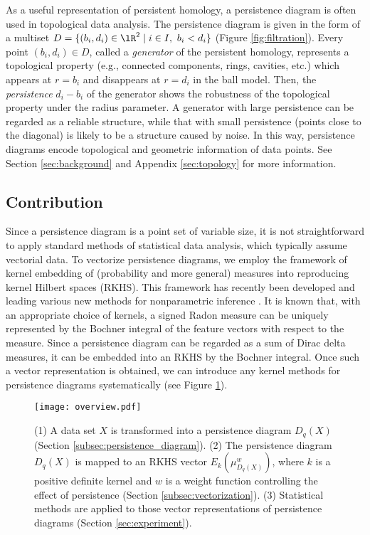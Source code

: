 \documentclass{article}
\begin{document}
As a useful representation of persistent homology, a persistence diagram is often used in topological data analysis.
The persistence diagram is given in the form of a multiset $D=\{(b_i,d_i) \in \lR^{2} \mid i\in I, \ b_i < d_i\}$ (Figure \ref{fig:filtration}).
Every point $(b_i,d_i)\in D$, called a {\em generator} of the persistent homology, represents a topological property (e.g., connected components, rings, cavities, etc.) which appears at $r=b_i$ and disappears at $r=d_i$ in the ball model.
Then, the {\em persistence} $d_i-b_i$ of the generator shows the robustness of the topological property under the radius parameter.
A generator with large persistence can be regarded as a reliable structure, while that with small persistence (points close to the diagonal) is likely to be a structure caused by noise.
In this way, persistence diagrams encode topological and geometric information of data points.
See Section \ref{sec:background} and Appendix \ref{sec:topology} for more information.

\subsection{Contribution}
\label{subsec:contribution}

Since a persistence diagram is a point set of variable size, it is not straightforward to apply standard methods of statistical data analysis, which typically assume vectorial data.
To vectorize persistence diagrams, we employ the framework of kernel embedding of (probability and more general) measures into reproducing kernel Hilbert spaces (RKHS).
This framework has recently been developed and leading various new methods for nonparametric inference \cite{MFSS17,SGSS07,SFG13}.
It is known \cite{SFL11} that, with an appropriate choice of kernels, a signed Radon measure can be uniquely represented by the Bochner integral of the feature vectors with respect to the measure.
Since a persistence diagram can be regarded as a sum of Dirac delta measures, it can be embedded into an RKHS by the Bochner integral.
Once such a vector representation is obtained, we can introduce any kernel methods for persistence diagrams systematically (see Figure \ref{fig:overview}). 
\begin{figure}[htbp]
\begin{center}
\texttt{[image: overview.pdf]}
\caption{
(1) A data set $X$ is transformed into a persistence diagram $D_q(X)$ (Section \ref{subsec:persistence_diagram}).
(2) The persistence diagram $D_q(X)$ is mapped to an RKHS vector $E_{k}(\mu_{D_{q}(X)}^{w})$, where $k$ is a positive definite kernel and $w$ is a weight function controlling the effect of persistence (Section \ref{subsec:vectorization}).
(3) Statistical methods are applied to those vector representations of  persistence diagrams (Section \ref{sec:experiment}).}
\label{fig:overview}
\end{center}
\end{figure}
\end{document}
